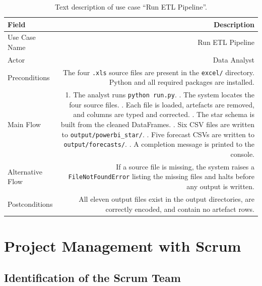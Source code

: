 \documentclass[12pt, a4paper]{report}
\begin{document}
\begin{table}[H]
\centering
\caption{Text description of use case ``Run ETL Pipeline''.}
\label{tab:uc_pipeline}
\begin{tabular}{L R}
  \toprule
  \textbf{Field} & \textbf{Description} \\
  \midrule
  Use Case Name  & Run ETL Pipeline \\
  Actor          & Data Analyst \\
  Preconditions  & The four \texttt{.xls} source files are present in the
                   \texttt{excel/} directory. Python and all required packages
                   are installed. \\
  Main Flow      & 1. The analyst runs \texttt{python run.py}. . The system locates the four source files. . Each file is loaded, artefacts are removed, and columns
                      are typed and corrected. . The star schema is built from the cleaned DataFrames. . Six CSV files are written to \texttt{output/powerbi\_star/}. . Five forecast CSVs are written to \texttt{output/forecasts/}. . A completion message is printed to the console. \\
  Alternative Flow & If a source file is missing, the system raises a
                   \texttt{FileNotFoundError} listing the missing files and
                   halts before any output is written. \\
  Postconditions & All eleven output files exist in the output directories,
                   are correctly encoded, and contain no artefact rows. \\
  \bottomrule
\end{tabular}
\end{table}

\section{Project Management with Scrum}

\subsection{Identification of the Scrum Team}
\end{document}
